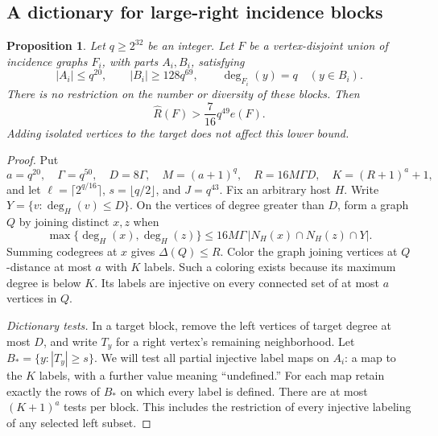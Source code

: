 \documentclass[11pt]{amsart}
\newtheorem{proposition}[theorem]{Proposition}
\theoremstyle{definition}
\theoremstyle{remark}
\numberwithin{equation}{section}
\begin{document}
\subsection{A dictionary for large-right incidence blocks}

\begin{proposition}\label{prop:dictionary}
Let $q\ge2^{32}$ be an integer. Let $ F$ be a vertex-disjoint union of
incidence graphs $F_i $, with parts $ A_i,B_i$, satisfying
\[
 |A_i|\le q^{20},\qquad |B_i|\ge128q^{69},\qquad
 \deg_{F_i}(y)=q\quad(y\in B_i).
\]
There is no restriction on the number or diversity of these blocks.
Then
\[
 \widehat R(F)>\frac7{16}q^{49}e(F).
\]
Adding isolated vertices to the target does not affect this lower bound.
\end{proposition}
\begin{proof}
Put
\[
 a=q^{20},\quad \Gamma=q^{50},\quad D=8\Gamma,\quad
 M=(a+1)^q,\quad R=16M\Gamma D,\quad K=(R+1)^a+1,
\]
and let $\ell=\lceil2^{q/16}\rceil $, $ s=\lfloor q/2\rfloor $, and $ J=q^{43}$.
Fix an arbitrary host $H $. Write $ Y=\{v:\deg_H(v)\le D\}$.
On the vertices of degree greater than $D $, form a graph $ Q$ by joining
distinct $x,z$ when
\[
 \max\{\deg_H(x),\deg_H(z)\}
 \le16M\Gamma\,|N_H(x)\cap N_H(z)\cap Y|.
\]
Summing codegrees at $x $ gives $\Delta(Q)\le R$. Color the graph joining
vertices at $Q $-distance at most $ a $ with $ K$ labels. Such a coloring
exists because its maximum degree is below $K$. Its labels are injective
on every connected set of at most $a $ vertices in $ Q$.

\medskip\noindent\emph{Dictionary tests.}
In a target block, remove the left vertices of target degree at most $D$,
and write $T_y$ for a right vertex's remaining neighborhood. Let
$B_* =\{y:|T_y|\ge s\}$. We will test all partial injective label maps on
$A_i $: a map to the $ K$ labels, with a further value meaning ``undefined.''
For each map retain exactly the rows of $B_*$ on which every label is
defined. There are at most $(K+1)^a$ tests per block. This includes the
restriction of every injective labeling of any selected left subset.


\end{proof}
\end{document}
